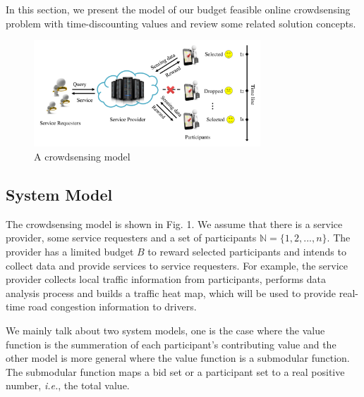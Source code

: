\documentclass[conference,compsocconf,letterpaper,10pt]{IEEEtran}
\newcommand{\ie}{{\em i.e.}}
\begin{document}
In this section, we present the model of our budget feasible online crowdsensing problem with time-discounting values and review some related solution concepts.
\begin{figure}[!ht]
\centering
\includegraphics[width=8.5cm]{system2.pdf}
\vspace{-0.3cm}
\caption{A crowdsensing model}
\vspace{-0.5cm}
\end{figure}

\subsection{System Model}
The crowdsensing model is shown in Fig. 1. We assume that there is a service provider, some service requesters and a set of participants $\mathbb{N}=\{1,2,..., n\}.$ The provider has a limited budget $B$ to reward selected participants and intends to collect data and  provide services to service requesters. For example, the service provider collects local traffic information from participants, performs data analysis process and builds a traffic heat map, which will be used to provide real-time road congestion information to drivers.

We mainly talk about two system models, one is the case where the value function is the summeration of each participant's contributing value and the other model is more general where the value function is a submodular function. The submodular function maps a bid set or a participant set to a real positive number, \ie, the total value.
\end{document}
